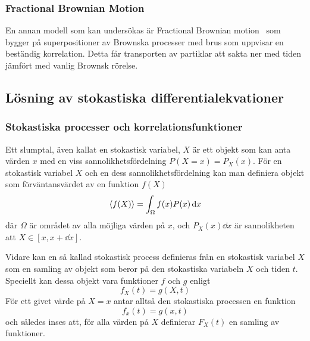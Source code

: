 \subsubsection{Fractional Brownian Motion}

En annan modell som kan undersökas är Fractional Brownian motion~\cite{Hofling&Franosch2013} som bygger på superpositioner av Brownska processer med brus som uppvisar en beständig korrelation. Detta får transporten av partiklar att sakta ner med tiden jämfört med vanlig Brownsk rörelse.


\subsection{Lösning av stokastiska differentialekvationer}

\subsubsection{Stokastiska processer och korrelationsfunktioner}
Ett slumptal, även kallat en stokastisk variabel, $X$ är ett objekt som kan anta värden $x$ med en viss sannolikhetsfördelning $P(X=x)=P_X(x)$. För en stokastisk variabel $X$ och en dess sannolikhetsfördelning kan man definiera objekt som förväntansvärdet av en funktion $f(X)$
\begin{equation}
    \ev{f(X)} = \int_{\Omega} f(x)P(x) \id{x}
\end{equation}
där $\Omega$ är området av alla möjliga värden på $x$, och $P_X(x)\dd{x}$ är sannolikheten att $X\in[x,x+\dd{x}]$. 

Vidare kan en så kallad stokastisk process definieras från en stokastisk variabel $X$ som en samling av objekt som beror på den stokastiska variabeln $X$ och tiden $t$\footnotemark. Speciellt kan dessa objekt vara funktioner $f$ och $g$ enligt 
\begin{equation}
    f_X(t) = g(X,t)
\end{equation}
För ett givet värde på $X=x$ antar alltså den stokastiska processen en funktion
\begin{equation}
    f_x(t) = g(x,t)
\end{equation}
och således inses att, för alla värden på $X$ definierar $F_X(t)$ en
samling av funktioner. 

